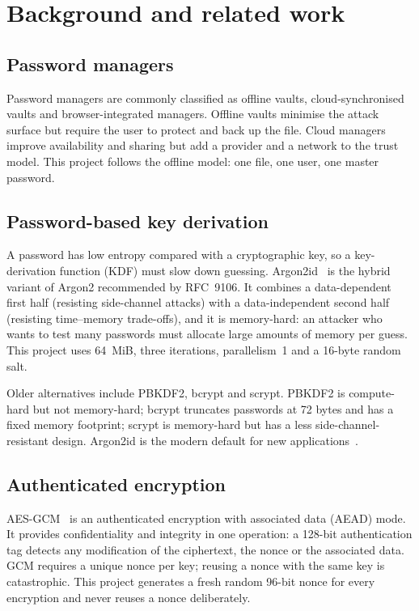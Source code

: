 \documentclass[11pt,a4paper]{article}
\begin{document}
\section{Background and related work}\label{sec:background}

\subsection{Password managers}

Password managers are commonly classified as offline vaults, cloud-synchronised
vaults and browser-integrated managers. Offline vaults minimise the attack
surface but require the user to protect and back up the file. Cloud managers
improve availability and sharing but add a provider and a network to the trust
model. This project follows the offline model: one file, one user, one master
password.

\subsection{Password-based key derivation}

A password has low entropy compared with a cryptographic key, so a key-derivation
function (KDF) must slow down guessing. Argon2id~\cite{rfc9106} is the hybrid
variant of Argon2 recommended by RFC~9106. It combines a data-dependent first
half (resisting side-channel attacks) with a data-independent second half
(resisting time--memory trade-offs), and it is memory-hard: an attacker who wants
to test many passwords must allocate large amounts of memory per guess. This
project uses 64~MiB, three iterations, parallelism~1 and a 16-byte random salt.

Older alternatives include PBKDF2, bcrypt and scrypt. PBKDF2 is compute-hard but
not memory-hard; bcrypt truncates passwords at 72 bytes and has a fixed memory
footprint; scrypt is memory-hard but has a less side-channel-resistant design.
Argon2id is the modern default for new applications~\cite{nist80063b,owasp}.

\subsection{Authenticated encryption}

AES-GCM~\cite{nistgcm} is an authenticated encryption with associated data
(AEAD) mode. It provides confidentiality and integrity in one operation: a
128-bit authentication tag detects any modification of the ciphertext, the
nonce or the associated data. GCM requires a unique nonce per key; reusing a
nonce with the same key is catastrophic. This project generates a fresh random
96-bit nonce for every encryption and never reuses a nonce deliberately.
\end{document}
